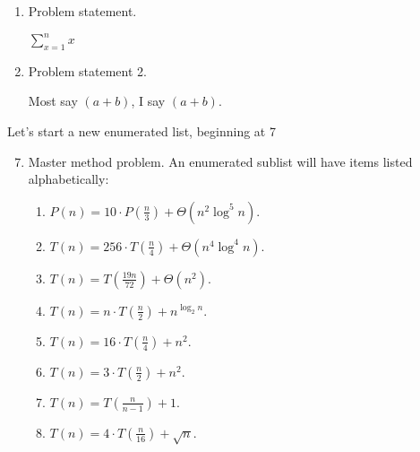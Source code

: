 \documentclass[12pt]{article}
\begin{document}
\begin{enumerate}


     \item  Problem statement.

           $\sum_{x{=}1}^n x$\\


   \item  Problem statement 2.

          Most say $(a+b)$, I say  $(a{+}b)$.\\


\end{enumerate}



Let's start a new enumerated list, beginning at 7
\begin{enumerate}
 \setcounter{enumi}{6}  %
 
\item Master method problem. An enumerated sublist will have items listed alphabetically:
\begin{enumerate}

\itemsep-0.35cm

\item  $P(n)=10\cdot P(\frac{n}{3}) + \Theta(n^2\log^5 n)$.\\
 
  \item  $T(n) = 256\cdot T(\frac{n}{4}) + \Theta(n^4\log^4 n)$. \\

\item $T(n) = T(\frac{19n}{72}) + \Theta(n^2)$.\\

\item $T(n) = n\cdot T(\frac{n}{2}) + n^{\log_2 n}$.\\

 \item  $T(n) =   16\cdot T(\frac{n}{4}) + n^2$.  \\
 
  \item  $T(n) =  3\cdot T(\frac{n}{2}) + n^2$.\\
  
 \item $T(n) =   T(\frac{n}{n{-}1}) + 1$.\\
 
\item  $T(n) =  4\cdot T(\frac{n}{16}) + \sqrt{n}$. 

\end{enumerate}
\end{enumerate}
\end{document}
